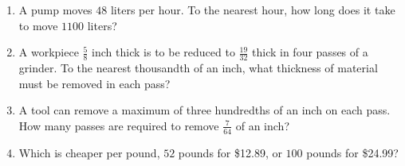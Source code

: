 \documentclass[12pt]{article}
\begin{document}
\begin{enumerate}
\item A pump moves $48$ liters per hour. To the nearest hour, how long does it take to move $1100$ liters? 
\spacing

\item A workpiece $\frac{5}{8}$ inch thick is to be reduced to $\frac{19}{32}$ thick in four passes of a grinder. To the nearest thousandth of an inch, what thickness of material must be removed in each pass? 
\spacing

\item A tool can remove a maximum of three hundredths of an inch on each pass. How many passes are required to remove $\frac{7}{64}$ of an inch? 
\spacing

\item Which is cheaper per pound, $52$ pounds for \$12.89, or $100$ pounds for \$24.99? 

\end{enumerate}
\end{document}
